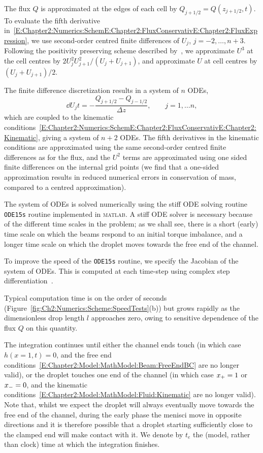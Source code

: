 The flux $Q$ is approximated at the edges of each cell by $Q_{j+1/2} = Q(z_{j+1/2},t)$. To evaluate the fifth derivative in~\eqref{E:Chapter2:Numerics:SchemE:Chapter2:FluxConservativE:Chapter2:FluxExpression}, we use second-order centred finite differences of $U_j$, $j = -2,\dots, n+3$. Following the positivity preserving scheme described by~\cite{Zhornitskaya2006SIAMNA}, we approximate $U^3$ at the cell centres by $2U_j^2 U_{j+1}^2/(U_j + U_{j+1})$, and approximate $U$ at cell centres by $(U_j +U_{j+1})/2$.

The finite difference discretization results in a system of $n$ ODEs,
\begin{equation}\label{E:Ch2:Numerics:Scheme:DiscretizedODEs}
\dd{U_j}{t} = -\frac{Q_{j + 1/2} - Q_{j -1/2}}{\Delta z}, \qquad j = 1,\dots n,
\end{equation}
which are coupled to the kinematic conditions~\eqref{E:Chapter2:Numerics:SchemE:Chapter2:FluxConservativE:Chapter2:Kinematic}, giving a system of $n + 2$ ODEs. The fifth derivatives in the kinematic conditions are approximated using the same second-order centred finite differences as for the flux, and the $U^2$ terms are approximated using one sided finite differences on the internal grid points (we find that a one-sided approximation results in reduced numerical errors in conservation of mass, compared to a centred approximation).

The system of ODEs is solved numerically using the stiff ODE solving routine \texttt{ODE15s} routine implemented in \textsc{matlab}. A stiff ODE solver is necessary because of the different time scales in the problem; as we shall see, there is a short (early) time scale on which the beams respond to an initial torque imbalance, and a longer time scale on which the droplet moves towards the free end of the channel.

To improve the speed of the \texttt{ODE15s} routine, we specify the Jacobian of the system of ODEs. This is computed at each time-step using complex step differentiation~\citep{Shampine2007ACM}.

Typical computation time is on the order of seconds (Figure~\ref{fig:Ch2:Numerics:Scheme:SpeedTests}(b)) but grows rapidly as the dimensionless drop length $l$ approaches zero, owing to sensitive dependence of the flux $Q$ on this quantity.

The integration continues until either the channel ends touch (in which case $h(x = 1,t) = 0$, and the free end conditions~\eqref{E:Chapter2:Model:MathModel:Beam:FreeEndBC} are no longer valid), or the droplet touches one end of the channel (in which case $x_{+} = 1$ or $x_{-} = 0$, and the kinematic conditions~\eqref{E:Chapter2:Model:MathModel:Fluid:Kinematic} are no longer valid). Note that, whilst we expect the droplet will always eventually move towards the free end of the channel, during the early phase the menisci move in opposite directions and it is therefore possible that a droplet starting sufficiently close to the clamped end will make contact with it. We denote by $t_e$ the (model, rather than clock) time at which the integration finishes.


